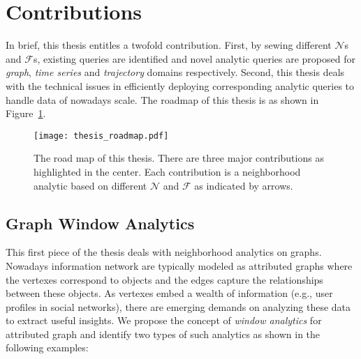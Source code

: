 \section{Contributions}
In brief, this thesis entitles a twofold contribution.
First, by sewing different $\mathcal{N}$s and $\mathcal{F}$s, existing
queries are identified and novel analytic queries are proposed for 
\emph{graph}, \emph{time series} and \emph{trajectory} domains respectively. 
Second, this thesis
deals with the technical issues in efficiently deploying corresponding analytic queries to
handle data of nowadays scale.
The roadmap of this thesis is as shown in Figure~\ref{fig:thesis_roadmap}.
\begin{figure}[h]
\centering
\texttt{[image: thesis\_roadmap.pdf]}
\caption{The road map of this thesis. There are three major contributions as highlighted in the center. Each contribution
is a neighborhood analytic based on different $\mathcal{N}$ and $\mathcal{F}$ as indicated by arrows.} 
\label{fig:thesis_roadmap}
\end{figure}


\subsection{Graph Window Analytics}
This first piece of the thesis deals with neighborhood analytics
on graphs. Nowadays information network are typically
modeled as attributed graphs where the 
vertexes correspond to objects and the edges capture the
relationships between these objects. As vertexes embed a wealth
of information (e.g., user profiles in social networks), there are 
emerging demands on analyzing these data to extract useful insights. We propose the concept of \emph{window analytics} 
for attributed graph and identify two types of such analytics as shown in the following examples:

